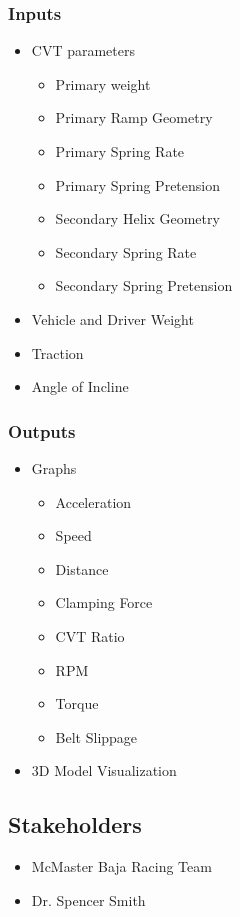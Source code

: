 \documentclass{article}
\begin{document}
\subsubsection{Inputs}
\begin{itemize}
    \item CVT parameters
    \begin{itemize}
        \item Primary weight
        \item Primary Ramp Geometry
        \item Primary Spring Rate
        \item Primary Spring Pretension
        \item Secondary Helix Geometry
        \item Secondary Spring Rate
        \item Secondary Spring Pretension
    \end{itemize}
    \item Vehicle and Driver Weight
    \item Traction
    \item Angle of Incline
\end{itemize}
\subsubsection{Outputs}
\begin{itemize}
    \item Graphs
    \begin{itemize}
        \item Acceleration
        \item Speed
        \item Distance
        \item Clamping Force
        \item CVT Ratio
        \item RPM
        \item Torque
        \item Belt Slippage
    \end{itemize}
    \item 3D Model Visualization
\end{itemize}

\subsection{Stakeholders}
\begin{itemize}
    \item McMaster Baja Racing Team
    \item Dr. Spencer Smith
\end{itemize}
\end{document}
